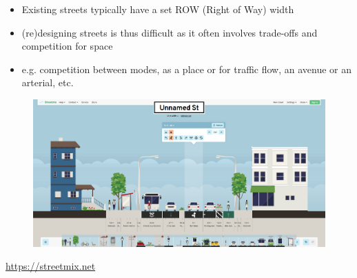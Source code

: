 \documentclass[aspectratio=169]{beamer}
\begin{document}
\begin{frame}
	
	\begin{itemize}
		\item Existing streets typically have a set ROW (Right of Way) width
		\item (re)designing streets is thus difficult as it often involves trade-offs and competition for space
		\item e.g. competition between modes, as a place or for traffic flow, an avenue or an arterial, etc.
	\end{itemize}
	

	
	
	
%		
%		
%		
%		
	
	
	\begin{figure}
		\centering
		\includegraphics[width=0.85\linewidth]{images/streetmix.png}
	\end{figure}
	
	\tiny\url{https://streetmix.net}
	
\end{frame}
\end{document}
